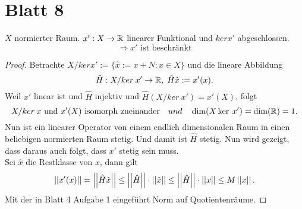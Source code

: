 \documentclass[FunkAnaSkriptSS2017.tex]{subfiles} %
\begin{document}
	\setcounter{section}{7}
\section{Blatt 8}				

	\begin{beh}
		$X$ normierter Raum. $x' : X\to \mathbb{R}$ linearer Funktional und $ker x'$ abgeschlossen. 
		$$\Rightarrow x' \text{ ist beschränkt}$$
	\end{beh}
	\begin{proof}
		Betrachte $ X/ker x':= \{ \hat{x} := x + N: x\in X\} $ und die lineare Abbildung
			$$ \hat{H} : X/ker \:x' \to \mathbb{R}, \; \hat{H}\hat{x} := x'(x).$$
		Weil $x'$ linear ist und $\hat{H}$ injektiv und $\hat{H}(X/ker\: x') = x'(X)$, folgt
			$$X/ker\:x \text{ und } x'(X) \text{ isomorph zueinander} \quad und \quad \dim(X\ker \:x') = \dim(\mathbb{R}) = 1.$$ 
	Nun ist ein linearer Operator von einem endlich dimensionalen Raum in einen beliebigen normierten Raum stetig. Und damit ist $\hat{H}$ stetig. Nun wird gezeigt, dass daraus auch folgt, dass $x'$ stetig sein muss.\\
	Sei $\hat{x}$ die Restklasse von $x$, dann gilt 
		$$\left\lvert \left\lvert x'(x) \right\rvert \right\rvert = \left\lvert \left\lvert \hat{H}\hat{x} \right\rvert \right\rvert \leq \left\lvert \left\lvert \hat{H} \right\rvert \right\rvert \cdot \left\lvert \left\lvert \hat{x} \right\rvert \right\rvert \leq \left\lvert \left\lvert \hat{H} \right\rvert \right\rvert \cdot \left\lvert \left\lvert {x} \right\rvert \right\rvert \leq M \left\lvert \left\lvert x \right\rvert \right\rvert. $$ 
	Mit der in Blatt 4 Aufgabe 1 eingeführt Norm auf Quotientenräume.	
	\end{proof}

	
\end{document}
